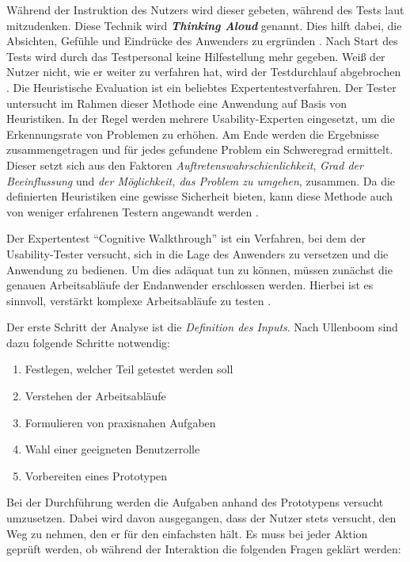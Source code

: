Während der Instruktion des Nutzers wird dieser gebeten, während des Tests laut mitzudenken. Diese Technik wird \textbf{\textit{Thinking Aloud}} genannt. Dies hilft dabei, die Absichten, Gefühle und Eindrücke des Anwenders zu ergründen \cite[S. 1]{Fromman2005}. Nach Start des Tests wird durch das Testpersonal keine Hilfestellung mehr gegeben. Weiß der Nutzer nicht, wie er weiter zu verfahren hat, wird der Testdurchlauf abgebrochen \cite[S. 231]{Ullenboom2014}.
Die Heuristische Evaluation ist ein beliebtes Expertentestverfahren. Der Tester untersucht im Rahmen dieser Methode eine Anwendung auf Basis von Heuristiken. In der Regel werden mehrere Usability-Experten eingesetzt, um die Erkennungsrate von Problemen zu erhöhen. Am Ende werden die Ergebnisse zusammengetragen und für jedes gefundene Problem ein Schweregrad ermittelt. Dieser setzt sich aus den Faktoren \textit{Auftretenswahrschienlichkeit}, \textit{Grad der Beeinflussung} und \textit{der Möglichkeit, das Problem zu umgehen}, zusammen. Da die definierten Heuristiken eine gewisse Sicherheit bieten, kann diese Methode auch von weniger erfahrenen Testern angewandt werden \cite[S. 232f.]{Ullenboom2014}.\par
{}
Der Expertentest \enquote{Cognitive Walkthrough} ist ein Verfahren, bei dem der Usability-Tester versucht, sich in die Lage des Anwenders zu versetzen und die Anwendung zu bedienen. Um dies adäquat tun zu können, müssen zunächst die genauen Arbeitsabläufe der Endanwender erschlossen werden. Hierbei ist es sinnvoll, verstärkt komplexe Arbeitsabläufe zu testen \cite[S. 234]{Ullenboom2014}.\par
Der erste Schritt der Analyse ist die \textit{Definition des Inputs}. Nach Ullenboom sind dazu folgende Schritte notwendig:
\begin{enumerate}
	\item Festlegen, welcher Teil getestet werden soll
	\item Verstehen der Arbeitsabläufe
	\item Formulieren von praxisnahen Aufgaben
	\item Wahl einer geeigneten Benutzerrolle
	\item Vorbereiten eines Prototypen \cite[S. 234]{Ullenboom2014}
\end{enumerate}
Bei der Durchführung werden die Aufgaben anhand des Prototypens versucht umzusetzen. Dabei wird davon ausgegangen, dass der Nutzer stets versucht, den Weg zu nehmen, den er für den einfachsten hält. Es muss bei jeder Aktion geprüft werden, ob während der Interaktion die folgenden Fragen geklärt werden:
